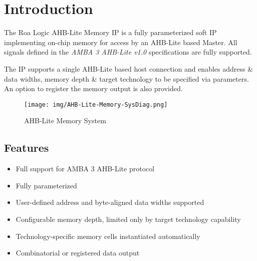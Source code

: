 \chapter{Introduction}\label{introduction}

The Roa Logic AHB-Lite Memory IP is a fully parameterized soft IP
implementing on-chip memory for access by an AHB-Lite based Master. 
All signals defined in the \emph{AMBA 3 AHB-Lite v1.0} specifications are
fully supported.

The IP supports a single AHB-Lite based host connection and enables
address \& data widths, memory depth \& target technology to be
specified via parameters. An option to register the memory output is
also provided.

\begin{figure}[th]
	\centering
	\texttt{[image: img/AHB-Lite-Memory-SysDiag.png]}
	\caption{AHB-Lite Memory System}
	\label{fig:ahb-lite-memory-sysdiag}
\end{figure}

\section{Features}\label{features}

\begin{itemize}
\item
  Full support for AMBA 3 AHB-Lite protocol
\item
  Fully parameterized
\item
  User-defined address and byte-aligned data widths supported
\item
  Configurable memory depth, limited only by target technology
  capability
\item
  Technology-specific memory cells instantiated automatically
\item
  Combinatorial or registered data output
\end{itemize}